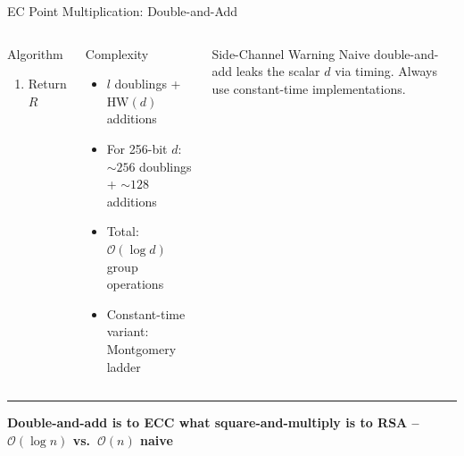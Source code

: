 \documentclass[8pt,aspectratio=169]{beamer}
\newcommand{\bottomnote}[1]{\vfill\vspace{-2mm}\textcolor{mllavender2}{\rule{\textwidth}{0.4pt}}\vspace{1mm}\footnotesize\textbf{#1}}
\begin{document}
\begin{frame}{EC Point Multiplication: Double-and-Add}
\begin{columns}
\begin{block}{Algorithm}
\begin{enumerate}
    \begin{enumerate}\scriptsize
      \item $R \leftarrow 2R$ \quad (point doubling)
      \item If $d_i = 1$: $R \leftarrow R + G$ \quad (point addition)
    \end{enumerate}
  \item Return $R$
\end{enumerate}
\end{block}
\vspace{1mm}
\begin{block}{Complexity}
\begin{itemize}\small
  \item $l$ doublings + $\text{HW}(d)$ additions
  \item For 256-bit $d$: $\sim 256$ doublings + $\sim 128$ additions
  \item Total: $\mathcal{O}(\log d)$ group operations
  \item Constant-time variant: Montgomery ladder
\end{itemize}
\end{block}
\begin{alertblock}{Side-Channel Warning}
\small Naive double-and-add leaks the scalar $d$ via timing. Always use constant-time implementations.
\end{alertblock}
\end{columns}
\bottomnote{Double-and-add is to ECC what square-and-multiply is to RSA -- $\mathcal{O}(\log n)$ vs.\ $\mathcal{O}(n)$ naive}
\end{frame}
\end{document}

